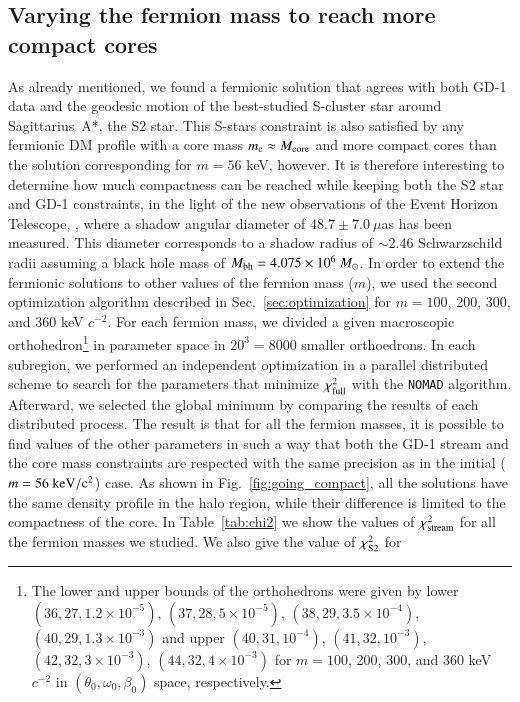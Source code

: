 \documentclass[referee]{aa} %
\begin{document}
\subsection{Varying the fermion mass to reach more compact cores}
As already mentioned, we found a fermionic solution that agrees with both GD-1 data and
the geodesic motion of the best-studied S-cluster star around Sagittarius~A*, the S2 star. This S-stars constraint is also satisfied by any fermionic DM profile
with a core mass $m_\mathrm{c}\approx M_{\rm{core}}$ and more compact cores than the solution corresponding for $m=56$ keV, however. It is therefore interesting to determine how much compactness can be reached
while keeping both the S2 star and \hbox{GD-1} constraints, in the light of the new observations
of the Event Horizon Telescope, \cite{EHT_image}, where a shadow angular diameter of $48.7\pm7.0~\mu$as
has been measured. This diameter corresponds to a shadow radius of $\sim 2.46$ Schwarzschild radii assuming
a black hole mass of $M_{\rm{bh}}=4.075\times10^6~M_\odot$.
In order to extend the fermionic solutions to other values of the fermion mass ($m$), we used the second optimization algorithm described in Sec.~\ref{sec:optimization} for $m=100$, 200, 300, and 360 keV $c^{-2}$. For each fermion mass, we divided a given macroscopic orthohedron\footnote{The lower and upper bounds of the orthohedrons were given by
lower $(36, 27, 1.2\times10^{-5})$, $(37, 28, 5\times10^{-5})$, $(38, 29, 3.5\times10^{-4})$, $(40, 29, 1.3\times10^{-3})$ and
upper $(40, 31, 10^{-4})$, $(41, 32, 10^{-3})$, $(42, 32, 3\times10^{-3})$, $(44, 32, 4\times10^{-3})$ for $m=100$, 200, 300, and 360 keV $c^{-2}$ in $(\theta_0, \omega_0, \beta_0)$ space, respectively.}
in parameter space in $20^3=8000$ smaller orthoedrons. In each subregion, we performed an independent optimization in a parallel distributed scheme to search for the parameters that minimize $\chi^2_{\rm{full}}$ with the \texttt{NOMAD} algorithm. Afterward, we selected the global minimum by comparing the results of each distributed process.
The result is that for all the fermion masses, it is possible to find values of the other parameters in such a way that both the GD-1 stream and the core mass constraints  are respected with the same precision as in the initial ($m=56~\rm{keV}/c^2$) case. As shown in Fig.~\ref{fig:going_compact}, all the solutions have the same density profile in the halo region, while their difference is limited to the compactness of the core.
In Table~\ref{tab:chi2} we show the values of $\chi^2_{\rm{stream}}$
for all the fermion masses we studied. We also give the value of $\chi^2_{\rm{S2}}$ for
\end{document}
